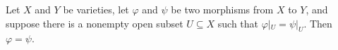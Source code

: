 Let $X$ and $Y$ be varieties, let $\varphi$ and $\psi$ be two morphisms from $X$ to $Y$, and suppose there is a nonempty open subset $U \subseteq X$ such that $\varphi|_U = \psi|_U$. Then $\varphi = \psi$.

